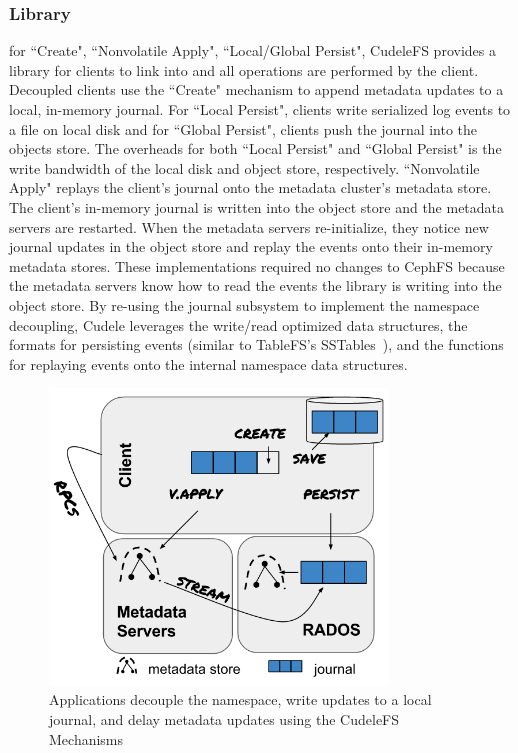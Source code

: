 \subsubsection{Library} for ``Create", ``Nonvolatile Apply", ``Local/Global
Persist", CudeleFS provides a library for clients to link into and all
operations are performed by the client.  Decoupled clients use the ``Create"
mechanism to append metadata updates to a local, in-memory journal.  For
``Local Persist", clients write serialized log events to a file on local disk
and for ``Global Persist", clients push the journal into the objects store. The
overheads for both ``Local Persist" and ``Global Persist" is the write
bandwidth of the local disk and object store, respectively.  ``Nonvolatile
Apply" replays the client's journal onto the metadata cluster's metadata store.
The client's in-memory journal is written into the object store and the
metadata servers are restarted. When the metadata servers re-initialize, they
notice new journal updates in the object store and replay the events onto their
in-memory metadata stores.  These implementations required no changes to CephFS
because the metadata servers know how to read the events the library is writing
into the object store.  By re-using the journal subsystem to implement the
namespace decoupling, Cudele leverages the write/read optimized data
structures, the formats for persisting events (similar to TableFS's
SSTables~\cite{ren:atc2013-tablefs}), and the functions for replaying events
onto the internal namespace data structures.  

\begin{figure}[tb]
\centering
\includegraphics[width=90mm]{figures/fig-decouple.png}
\caption{Applications decouple the namespace, write updates to a local journal,
and delay metadata updates using the CudeleFS Mechanisms }\label{fig:decouple}
\end{figure}

